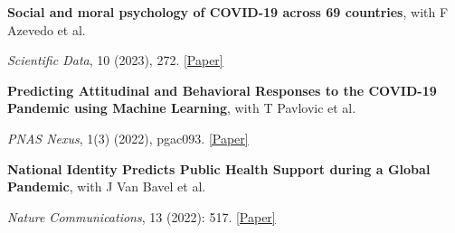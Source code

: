 \documentclass[letterpaper]{article}
\renewenvironment{itemize}{
  \begin{list}{}{
    \setlength{\leftmargin}{1.5em}
  }
}{
  \end{list}
}
\begin{document}
		\begin{itemize}
	\item \textbf{Social and moral psychology of COVID-19 across 69 countries}, with F Azevedo et al. 
			\vspace{-0.05in}
	\item \textit{Scientific Data}, 10 (2023), 272.  \href{https://psyarxiv.com/a3562/}{[Paper]}
\end{itemize}

\medskip


\begin{itemize}
	\item \textbf{Predicting Attitudinal and Behavioral Responses to the COVID-19 Pandemic using Machine Learning}, with T Pavlovic et al. 
		\vspace{-0.05in}
\item \textit{PNAS Nexus}, 1(3) (2022), pgac093.   \href{https://doi.org/10.1093/pnasnexus/pgac093}{[Paper]}
\end{itemize}


		\medskip


\begin{itemize}
	\item \textbf{National Identity Predicts Public Health Support during a Global Pandemic}, with J Van Bavel et al. 
		\vspace{-0.05in}
\item \textit{Nature Communications}, 13 (2022): 517. \href{https://www.nature.com/articles/s41467-021-27668-9}{[Paper]}
\end{itemize}

\medskip
\end{document}
